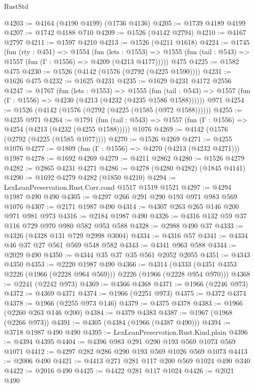 \begin{lexlean}{RustStd}
\begin{coremodule}
@4203 := @4164 (@4190 @4199) (@1736 @4136)
@4205 := @1739 @4189 @4199
@4207 := @1742 @4188 @710
@4209 := @1526 (@4142 @2794)
@4210 := @4167 @2797
@4211 := @1597 @4210
@4213 := @1526 (@4211 @1618)
@4224 := @1745
    (fun (rty : @451) =>
    @1554
      (fun (lets : @1553) =>
      @1555 (fun (tail : @543) => @1557 (fun (Γ : @1556) => @4209 (@4213 @4177)))))
    @475
@4225 := @1582 @475
@4230 := @1526 (@4142 (@1576 (@2792 (@4225 @1590))))
@4231 := @1626 @475
@4232 := @1625 @4231
@4235 := @1629 @4231 @4172 @2556
@4247 := @1767
    (fun (lets : @1553) =>
    @1555
      (fun (tail : @543) => @1557 (fun (Γ : @1556) => @4230 (@4213 (@4232 (@4235 @1586 @1588))))))
    @971
@4254 := @1526 (@4142 (@1576 (@2792 (@4225 (@1585 (@972 @1588))))))
@4255 := @4235 @971
@4264 := @1791
    (fun (tail : @543) => @1557 (fun (Γ : @1556) => @4254 (@4213 (@4232 (@4255 @1588)))))
    @1076
@4269 := @4142 (@1576 (@2792 (@4225 (@1585 @1077))))
@4270 := @1526 @4269
@4271 := @4255 @1076
@4277 := @1809 (fun (Γ : @1556) => @4270 (@4213 (@4232 @4271))) @1987
@4278 := @1692 @4269
@4279 := @4211 @2862
@4280 := @1526 @4279
@4282 := @2865 @4231 @4271
@4286 := @4278 (@4280 @4282) (@1845 @4141)
@4290 := @1692 @4279 @4282 (@1850 @4210)
@4294 := LexLeanPreservation.Rust.Corr.cond @1517 @1519 @1521
@4297 := @4294 @1987 @490 @490
@4305 := @4297 @266 @291 @290 @193 @971 @983 @569 @1076
@4307 := @2171 @1987 @490
@4314 := @4307 @263 @265 @146 @200 @971 @981 @973
@4316 := @2184 @1987 @490
@4326 := @4316 @132 @59 @37 @116 @729 @970 @980 @582 @953 @588
@4328 := @2988 @490 @37
@4333 := @4326 (@4328 @131 @729 @2998 @3004)
@4334 := @4316 @57
@4341 := @4334 @46 @37 @27 @561 @569 @548 @582
@4343 := @4341 @963 @588
@4344 := @2029 @490
@4350 := @4344 @35 @37 @35 @561 @2052 @2055
@4351 := @4343 @4350
@4353 := @2220 @1987 @490
@4366 := @4314 (@4333 (@4351 @4353 @2226 (@1966 (@2228 @964 @569))) @2226 (@1966 (@2228 @954 @970)))
@4368 := @2241 (@2242 @973)
@4369 := @4366 @4368
@4371 := @1966 (@2246 @973)
@4372 := @4369 @4371
@4374 := @1966 (@2251 @973)
@4375 := @4372 @4374
@4378 := @1966 (@2255 @973 @146)
@4379 := @4375 @4378
@4383 := @1966 (@2260 @263 @146 @200)
@4384 := @4379 @4383
@4387 := @1967 (@1968 (@2266 @973))
@4391 := @4305 (@4384 (@1966 (@4387 @490)))
@4394 := @3718 @1987 @490 @490
@4395 := LexLeanPreservation.Rust.Kind.plain
@4396 := @4394 @4395
@4404 := @4396 @983 @291 @290 @193 @569 @1073 @569 @1071
@4412 := @4297 @282 @286 @290 @193 @569 @1026 @569 @1073
@4413 := @2006 @490
@4421 := @4413 @271 @281 @117 @200 @569 @1024 @490 @340
@4422 := @2016 @490
@4425 := @4422 @281 @117 @1024
@4426 := @2021 @490

\end{coremodule}
\end{lexlean}
